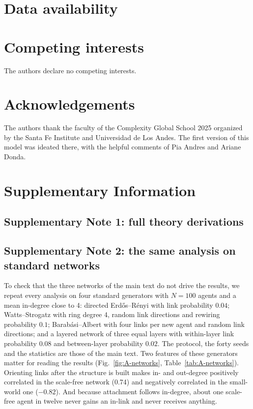 \documentclass[11pt]{article}
\begin{document}
\section*{Data availability}



\section*{Competing interests}
The authors declare no competing interests.

\section*{Acknowledgements}
The authors thank the faculty of the Complexity Global School 2025 organized by the Santa Fe Institute and Universidad de Los Andes. The first version of this model was ideated there, with the helpful comments of Pia Andres and Ariane Donda. 

\printbibliography


\clearpage
\section*{Supplementary Information}

\subsection*{Supplementary Note 1: full theory derivations}



\subsection*{Supplementary Note 2: the same analysis on standard networks}
\setcounter{figure}{0}
\setcounter{table}{0}

To check that the three networks of the main text do not drive the results, we repeat every analysis on four standard generators with $N = 100$ agents and a mean in-degree close to 4: directed Erd\H{o}s--R\'enyi with link probability $0.04$; Watts--Strogatz with ring degree 4, random link directions and rewiring probability $0.1$; Barab\'asi--Albert with four links per new agent and random link directions; and a layered network of three equal layers with within-layer link probability $0.08$ and between-layer probability $0.02$. The protocol, the forty seeds and the statistics are those of the main text. Two features of these generators matter for reading the results (Fig.~\ref{fig:A-networks}, Table~\ref{tab:A-networks}). Orienting links after the structure is built makes in- and out-degree positively correlated in the scale-free network (0.74) and negatively correlated in the small-world one ($-0.82$). And because attachment follows in-degree, about one scale-free agent in twelve never gains an in-link and never receives anything.
\end{document}
